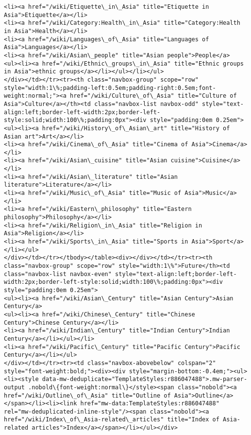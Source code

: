 \documentclass[11pt]{article}
\begin{document}
\begin{Verbatim}[commandchars=\\\{\}]
<li><a href="/wiki/Etiquette\_in\_Asia" title="Etiquette in Asia">Etiquette</a></li>
<li><a href="/wiki/Category:Health\_in\_Asia" title="Category:Health in Asia">Health</a></li>
<li><a href="/wiki/Languages\_of\_Asia" title="Languages of Asia">Languages</a></li>
<li><a href="/wiki/Asian\_people" title="Asian people">People</a>
<ul><li><a href="/wiki/Ethnic\_groups\_in\_Asia" title="Ethnic groups in Asia">ethnic groups</a></li></ul></li></ul>
</div></td></tr><tr><th class="navbox-group" scope="row" style="width:1\%;padding-left:0.5em;padding-right:0.5em;font-weight:normal;"><a href="/wiki/Culture\_of\_Asia" title="Culture of Asia">Culture</a></th><td class="navbox-list navbox-odd" style="text-align:left;border-left-width:2px;border-left-style:solid;width:100\%;padding:0px"><div style="padding:0em 0.25em">
<ul><li><a href="/wiki/History\_of\_Asian\_art" title="History of Asian art">Art</a></li>
<li><a href="/wiki/Cinema\_of\_Asia" title="Cinema of Asia">Cinema</a></li>
<li><a href="/wiki/Asian\_cuisine" title="Asian cuisine">Cuisine</a></li>
<li><a href="/wiki/Asian\_literature" title="Asian literature">Literature</a></li>
<li><a href="/wiki/Music\_of\_Asia" title="Music of Asia">Music</a></li>
<li><a href="/wiki/Eastern\_philosophy" title="Eastern philosophy">Philosophy</a></li>
<li><a href="/wiki/Religion\_in\_Asia" title="Religion in Asia">Religion</a></li>
<li><a href="/wiki/Sports\_in\_Asia" title="Sports in Asia">Sport</a></li></ul>
</div></td></tr></tbody></table><div></div></td></tr><tr><th class="navbox-group" scope="row" style="width:1\%">Future</th><td class="navbox-list navbox-even" style="text-align:left;border-left-width:2px;border-left-style:solid;width:100\%;padding:0px"><div style="padding:0em 0.25em">
<ul><li><a href="/wiki/Asian\_Century" title="Asian Century">Asian Century</a>
<ul><li><a href="/wiki/Chinese\_Century" title="Chinese Century">Chinese Century</a></li>
<li><a href="/wiki/Indian\_Century" title="Indian Century">Indian Century</a></li></ul></li>
<li><a href="/wiki/Pacific\_Century" title="Pacific Century">Pacific Century</a></li></ul>
</div></td></tr><tr><td class="navbox-abovebelow" colspan="2" style="font-weight:bold;"><div><div style="margin-bottom:-0.4em;"><ul><li><style data-mw-deduplicate="TemplateStyles:r886047488">.mw-parser-output .nobold\{font-weight:normal\}</style><span class="nobold"><a href="/wiki/Outline\_of\_Asia" title="Outline of Asia">Outline</a></span></li><li><link href="mw-data:TemplateStyles:r886047488" rel="mw-deduplicated-inline-style"/><span class="nobold"><a href="/wiki/Index\_of\_Asia-related\_articles" title="Index of Asia-related articles">Index</a></span></li></ul></div>

\end{Verbatim}
\end{document}
